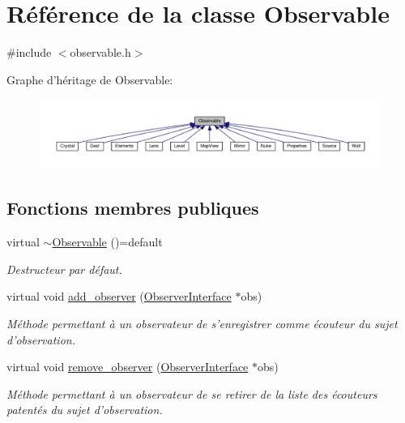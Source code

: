 \hypertarget{classObservable}{\section{Référence de la classe Observable}
\label{classObservable}
}


{\ttfamily \#include $<$observable.\+h$>$}



Graphe d'héritage de Observable\+:
\nopagebreak
\begin{figure}[H]
\begin{center}
\leavevmode
\includegraphics[width=350pt]{d7/d7e/classObservable__inherit__graph}
\end{center}
\end{figure}
\subsection*{Fonctions membres publiques}
\begin{DoxyCompactItemize}
\item 
\hypertarget{classObservable_a058acb5a674eba2b96648c66a27440d8}{virtual \hyperlink{classObservable_a058acb5a674eba2b96648c66a27440d8}{$\sim$\+Observable} ()=default}\label{classObservable_a058acb5a674eba2b96648c66a27440d8}

\begin{DoxyCompactList}\small\item\em Destructeur par défaut. \end{DoxyCompactList}\item 
virtual void \hyperlink{classObservable_a4d816915e134f1585a3f4151c6d74b1f}{add\+\_\+observer} (\hyperlink{classObserverInterface}{Observer\+Interface} $\ast$obs)
\begin{DoxyCompactList}\small\item\em Méthode permettant à un observateur de s'enregistrer comme écouteur du sujet d'observation. \end{DoxyCompactList}\item 
virtual void \hyperlink{classObservable_a79bdffc61fbea9b16d00d5bc6a2289ad}{remove\+\_\+observer} (\hyperlink{classObserverInterface}{Observer\+Interface} $\ast$obs)
\begin{DoxyCompactList}\small\item\em Méthode permettant à un observateur de se retirer de la liste des écouteurs patentés du sujet d'observation. \end{DoxyCompactList}\end{DoxyCompactItemize}

